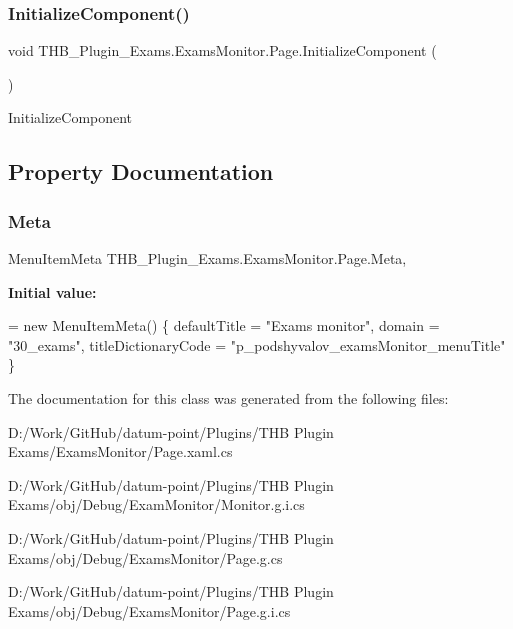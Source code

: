 \subsubsection{\texorpdfstring{Initialize\+Component()}{InitializeComponent()}\hspace{0.1cm}{\footnotesize\ttfamily [6/6]}}
{\footnotesize\ttfamily void T\+H\+B\+\_\+\+Plugin\+\_\+\+Exams.\+Exams\+Monitor.\+Page.\+Initialize\+Component (\begin{DoxyParamCaption}{ }\end{DoxyParamCaption})}



Initialize\+Component 



\subsection{Property Documentation}
\mbox{\label{class_t_h_b___plugin___exams_1_1_exams_monitor_1_1_page_a2a93c249b6171b34d0a60e049f4a552d}} 
\subsubsection{\texorpdfstring{Meta}{Meta}}
{\footnotesize\ttfamily Menu\+Item\+Meta T\+H\+B\+\_\+\+Plugin\+\_\+\+Exams.\+Exams\+Monitor.\+Page.\+Meta\hspace{0.3cm}{\ttfamily [get]}, {\ttfamily [set]}}

{\bfseries Initial value\+:}
\begin{DoxyCode}
= \textcolor{keyword}{new} MenuItemMeta()
        \{
            defaultTitle = \textcolor{stringliteral}{"Exams monitor"},
            domain = \textcolor{stringliteral}{"30\_exams"},
            titleDictionaryCode = \textcolor{stringliteral}{"p\_podshyvalov\_examsMonitor\_menuTitle"}
        \}
\end{DoxyCode}


The documentation for this class was generated from the following files\+:\begin{DoxyCompactItemize}
\item 
D\+:/\+Work/\+Git\+Hub/datum-\/point/\+Plugins/\+T\+H\+B Plugin Exams/\+Exams\+Monitor/Page.\+xaml.\+cs\item 
D\+:/\+Work/\+Git\+Hub/datum-\/point/\+Plugins/\+T\+H\+B Plugin Exams/obj/\+Debug/\+Exam\+Monitor/Monitor.\+g.\+i.\+cs\item 
D\+:/\+Work/\+Git\+Hub/datum-\/point/\+Plugins/\+T\+H\+B Plugin Exams/obj/\+Debug/\+Exams\+Monitor/Page.\+g.\+cs\item 
D\+:/\+Work/\+Git\+Hub/datum-\/point/\+Plugins/\+T\+H\+B Plugin Exams/obj/\+Debug/\+Exams\+Monitor/Page.\+g.\+i.\+cs\end{DoxyCompactItemize}
